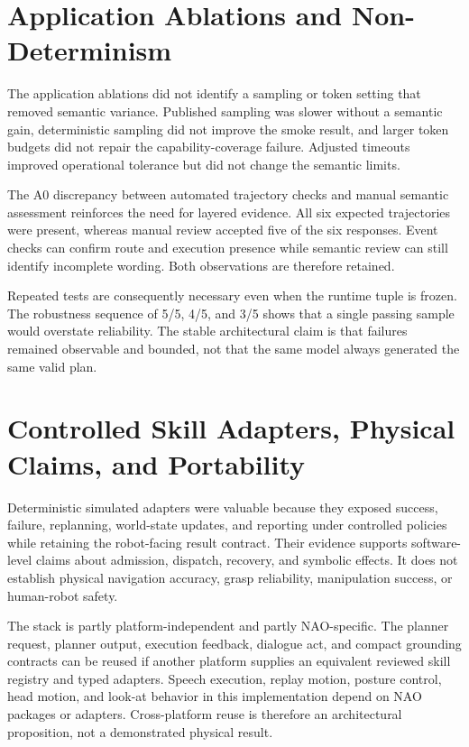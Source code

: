 \section{Application Ablations and Non-Determinism}

The application ablations did not identify a sampling or token setting that removed semantic variance. Published sampling was slower without a semantic gain, deterministic sampling did not improve the smoke result, and larger token budgets did not repair the capability-coverage failure. Adjusted timeouts improved operational tolerance but did not change the semantic limits.

The A0 discrepancy between automated trajectory checks and manual semantic assessment reinforces the need for layered evidence. All six expected trajectories were present, whereas manual review accepted five of the six responses. Event checks can confirm route and execution presence while semantic review can still identify incomplete wording. Both observations are therefore retained.

Repeated tests are consequently necessary even when the runtime tuple is frozen. The robustness sequence of 5/5, 4/5, and 3/5 shows that a single passing sample would overstate reliability. The stable architectural claim is that failures remained observable and bounded, not that the same model always generated the same valid plan.

\section{Controlled Skill Adapters, Physical Claims, and Portability}

Deterministic simulated adapters were valuable because they exposed success, failure, replanning, world-state updates, and reporting under controlled policies while retaining the robot-facing result contract. Their evidence supports software-level claims about admission, dispatch, recovery, and symbolic effects. It does not establish physical navigation accuracy, grasp reliability, manipulation success, or human-robot safety.

The stack is partly platform-independent and partly NAO-specific. The planner request, planner output, execution feedback, dialogue act, and compact grounding contracts can be reused if another platform supplies an equivalent reviewed skill registry and typed adapters. Speech execution, replay motion, posture control, head motion, and look-at behavior in this implementation depend on NAO packages or adapters. Cross-platform reuse is therefore an architectural proposition, not a demonstrated physical result.

